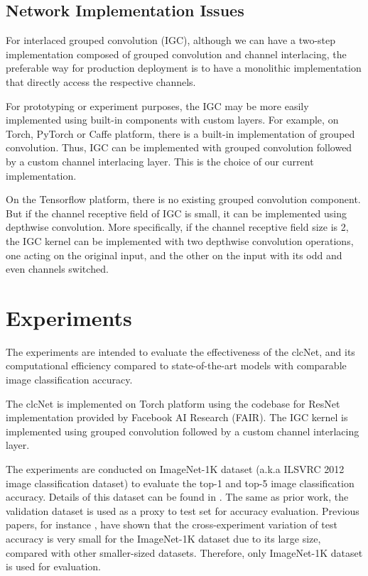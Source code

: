 \documentclass[10pt,twocolumn,letterpaper]{article}
\begin{document}
\subsection{Network Implementation Issues}

For interlaced grouped convolution (IGC), although we can have a two-step implementation composed of grouped convolution and channel interlacing, the preferable way for production deployment is to have a monolithic implementation that directly access the respective channels. 

For prototyping or experiment purposes, the IGC may be more easily implemented using built-in components with custom layers. For example, on Torch\cite{torch2011collobert}, PyTorch or Caffe\cite{caffe2014jia} platform, there is a built-in implementation of grouped convolution. Thus, IGC can be implemented with grouped convolution followed by a custom channel interlacing layer. This is the choice of our current implementation.

On the Tensorflow\cite{tensorflow2016abadi} platform, there is no existing grouped convolution component. But if the channel receptive field of IGC is small, it can be implemented using depthwise convolution. More specifically, if the channel receptive field size is 2, the IGC kernel can be implemented with two depthwise convolution operations, one acting on the original input, and the other on the input with its odd and even channels switched.

\section{Experiments}

The experiments are intended to evaluate the effectiveness of the clcNet, and its computational efficiency compared to state-of-the-art models with comparable image classification accuracy. 

The clcNet is implemented on Torch platform using the codebase \cite{fb.resnet} for ResNet implementation provided by Facebook AI Research (FAIR). The IGC kernel is implemented using grouped convolution followed by a custom channel interlacing layer.

The experiments are conducted on ImageNet-1K dataset (a.k.a ILSVRC 2012 image classification dataset) to evaluate the top-1 and top-5 image classification accuracy. Details of this dataset can be found in \cite{ilsvrc2015olga}. The same as prior work, the validation dataset is used as a proxy to test set for accuracy evaluation. Previous papers, for instance \cite{resnet2016he}, have shown that the cross-experiment variation of test accuracy is very small for the ImageNet-1K dataset due to its large size, compared with other smaller-sized datasets. Therefore, only ImageNet-1K dataset is used for evaluation.
\end{document}
